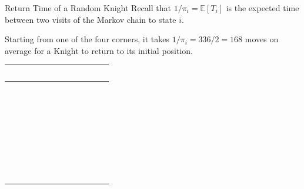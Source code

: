 \documentclass[letterpaper, mathserif]{beamer}
\def\E{\mathbb E}
\begin{document}
\begin{frame}{Return Time of a Random Knight}
Recall that $1/\pi_i=\E[T_i]$ is the expected time between two visits of the Markov chain to state $i$.

\begin{minipage}{0.7\linewidth}Starting from one of the four corners,
 it takes $1/\pi_i=336/2=168$ moves on average for a Knight to return to its initial position.
 \end{minipage}
\begin{minipage}{0.28\linewidth}\tabcolsep=3pt
\begin{flushright}
\renewcommand{\arraystretch}{0.65}
\begin{tabular}{|c|c|c|c|c|c|c|c|}\hline
\cellcolor{orange}~ & ~ & ~ & ~ & ~ & ~ & ~ & \cellcolor{orange}~ \\\hline
~ & ~ & ~ & ~ & ~ & ~ & ~ & ~ \\\hline
~ & ~ & ~ & ~ & ~ & ~ & ~ & ~ \\\hline
~ & ~ & ~ & ~ & ~ & ~ & ~ & ~ \\\hline
~ & ~ & ~ & ~ & ~ & ~ & ~ & ~ \\\hline
~ & ~ & ~ & ~ & ~ & ~ & ~ & ~ \\\hline
~ & ~ & ~ & ~ & ~ & ~ & ~ & ~ \\\hline
\cellcolor{orange}~ & ~ & ~ & ~ & ~ & ~ & ~ & \cellcolor{orange}~\\\hline
\end{tabular}
\end{flushright}
\end{minipage}\bigskip  


\end{frame}
\end{document}
